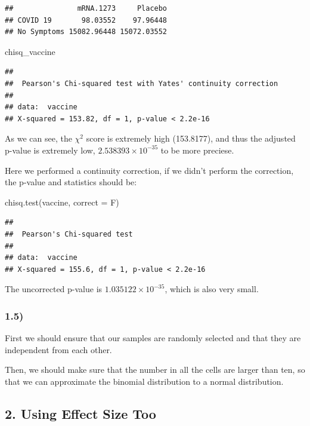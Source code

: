 \documentclass[
]{article}
\newenvironment{Shaded}{\begin{snugshade}}{\end{snugshade}}
\newcommand{\AttributeTok}[1]{\textcolor[rgb]{0.77,0.63,0.00}{#1}}
\newcommand{\FunctionTok}[1]{\textcolor[rgb]{0.00,0.00,0.00}{#1}}
\newcommand{\NormalTok}[1]{#1}
\begin{document}
\begin{verbatim}
##               mRNA.1273     Placebo
## COVID 19       98.03552    97.96448
## No Symptoms 15082.96448 15072.03552
\end{verbatim}

\begin{Shaded}
\begin{Highlighting}[]
\NormalTok{chisq\_vaccine}
\end{Highlighting}
\end{Shaded}

\begin{verbatim}
## 
##  Pearson's Chi-squared test with Yates' continuity correction
## 
## data:  vaccine
## X-squared = 153.82, df = 1, p-value < 2.2e-16
\end{verbatim}

As we can see, the \(\chi^2\) score is extremely high (153.8177), and
thus the adjusted p-value is extremely low, \(2.538393\times10^{-35}\)
to be more preciese.

Here we performed a continuity correction, if we didn't perform the
correction, the p-value and statistics should be:

\begin{Shaded}
\begin{Highlighting}[]
\FunctionTok{chisq.test}\NormalTok{(vaccine, }\AttributeTok{correct =}\NormalTok{ F)}
\end{Highlighting}
\end{Shaded}

\begin{verbatim}
## 
##  Pearson's Chi-squared test
## 
## data:  vaccine
## X-squared = 155.6, df = 1, p-value < 2.2e-16
\end{verbatim}

The uncorrected p-value is \(1.035122\times 10^{-35}\), which is also
very small.

\hypertarget{section-4}{%
\subsubsection{1.5)}\label{section-4}}

First we should ensure that our samples are randomly selected and that
they are independent from each other.

Then, we should make sure that the number in all the cells are larger
than ten, so that we can approximate the binomial distribution to a
normal distribution.

\hypertarget{using-effect-size-too}{%
\subsection{2. Using Effect Size Too}\label{using-effect-size-too}}
\end{document}
